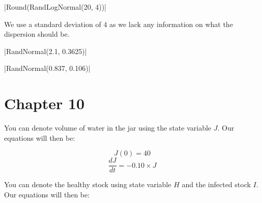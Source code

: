 \documentclass[]{memoir}
\newcommand{\DecValTok}[1]{\textcolor[rgb]{0.25,0.63,0.44}{{#1}}}
\newcommand{\FloatTok}[1]{\textcolor[rgb]{0.25,0.63,0.44}{{#1}}}
\newcommand{\FunctionTok}[1]{\textcolor[rgb]{0.02,0.16,0.49}{{#1}}}
\newcommand{\NormalTok}[1]{{#1}}
\begin{document}

|\FunctionTok{Round}\NormalTok{(}\FunctionTok{RandLogNormal}\NormalTok{(}\DecValTok{20}\NormalTok{, }\DecValTok{4}\NormalTok{))}|

We use a standard deviation of 4 as we lack any information on what the
dispersion should be.


|\FunctionTok{RandNormal}\NormalTok{(}\FloatTok{2.1}\NormalTok{, }\FloatTok{0.3625}\NormalTok{)}|


|\FunctionTok{RandNormal}\NormalTok{(}\FloatTok{0.837}\NormalTok{, }\FloatTok{0.106}\NormalTok{)}|

\section{Chapter 10}


You can denote volume of water in the jar using the state variable $J$.
Our equations will then be:

\[ J(0) = 40 \] \[ \frac{dJ}{dt} = -0.10 \times J\]


You can denote the healthy stock using state variable $H$ and the
infected stock $I$. Our equations will then be:
\end{document}
